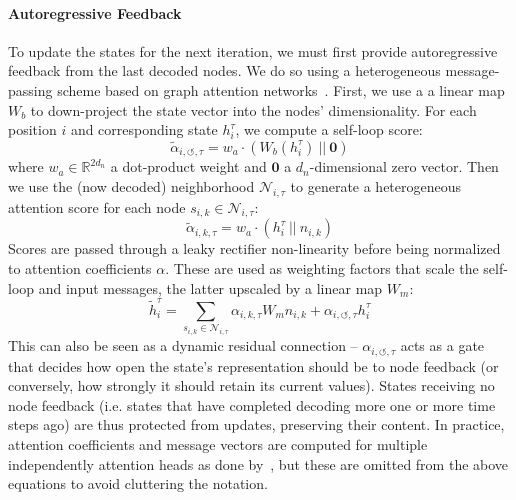 \paragraph{Autoregressive Feedback}
To update the states for the next iteration, we must first provide autoregressive feedback from the last decoded nodes.
We do so using a heterogeneous message-passing scheme based on graph attention networks~\cite{velivckovic2018graph,brody2021attentive}.
First, we use a a linear map $W_b$ to down-project the state vector into the nodes' dimensionality.
For each position $i$ and corresponding state $h^\tau_i$, we compute a self-loop score:
\begin{equation}
\tilde{\alpha}_{i,\circlearrowleft,\tau} = w_{a} \cdot (W_b(h^\tau_i) \ ||  \ \mathbf{0})
\end{equation}
where $w_a \in \mathbb{R}^{2d_n}$ a dot-product weight and $\mathbf{0}$ a $d_n$-dimensional zero vector.
Then we use the (now decoded) neighborhood $\mathcal{N}_{i, \tau}$ to generate a heterogeneous attention score for each node $s_{i, k} \in \mathcal{N}_{i, \tau}$:
\begin{equation}
\tilde{\alpha}_{i,k,\tau} = w_a \cdot (h^{\tau}_i \ || \ n_{i, k})
\end{equation}
Scores are passed through a leaky rectifier non-linearity before being normalized to attention coefficients $\alpha$.
These are used as weighting factors that scale the self-loop and input messages, the latter upscaled by a linear map $W_m$:
\begin{equation}
	\tilde{h}^\tau_i = \sum_{s_{i, k} \in \mathcal{N}_{i,\tau}} {\alpha}_{i,k,\tau}W_m n_{i,k} + {\alpha}_{i,\circlearrowleft,\tau} h^\tau_i
\end{equation}
This can also be seen as a dynamic residual connection -- $\alpha_{i,\circlearrowleft,\tau}$ acts as a gate that decides how open the state's representation should be to node feedback (or conversely, how strongly it should retain its current values).
States receiving no node feedback (i.e. states that have completed decoding more one or more time steps ago) are thus protected from updates, preserving their content.
In practice, attention coefficients and message vectors are computed for multiple independently attention heads as done by~\citet{vaswani2017attention}, but these are omitted from the above equations to avoid cluttering the notation.

